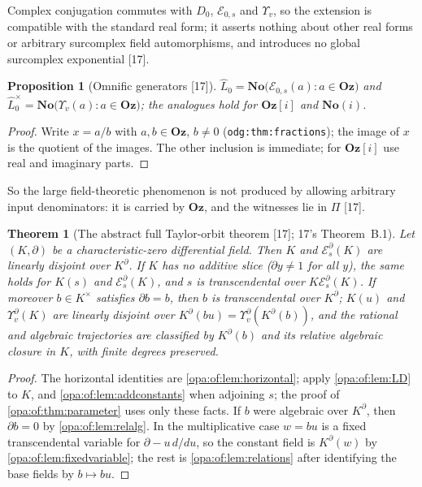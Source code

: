 \documentclass[11pt,oneside]{article}
\numberwithin{equation}{section}
\newtheorem{theorem}{Theorem}[section]
\newtheorem{proposition}[proposition]{Proposition}
\theoremstyle{definition}
\theoremstyle{remark}
\newcommand{\No}{\mathbf{No}}
\newcommand{\Oz}{\mathbf{Oz}}
\newcommand{\Og}{\mathbf{Oz}[i]}
\newcommand{\SC}{\mathbf{No}(i)}
\newcommand{\EE}{\mathcal E}
\newcommand{\src}[1]{\textup{\textsf{\small[#1]}}}
\newcommand{\lbl}[1]{\nolinkurl{#1}}
\begin{document}
Complex conjugation commutes with $D_0$, $\EE_{0,s}$ and $\Upsilon_v$, so the extension is compatible with the standard real form; it
asserts nothing about other real forms or arbitrary surcomplex field automorphisms, and introduces no global surcomplex
exponential \src{17}.

\begin{proposition}[Omnific generators \src{17}]\label{opa:of:prop:generators}
$\widehat L_0=\No\bigl(\EE_{0,s}(a):a\in\Oz\bigr)$ and $\widehat L^\times_0=\No\bigl(\Upsilon_v(a):a\in\Oz\bigr)$; the analogues hold for
$\Og$ and $\SC$.
\end{proposition}
\begin{proof}
Write $x=a/b$ with $a,b\in\Oz$, $b\ne0$ (\lbl{odg:thm:fractions}); the image of $x$ is the quotient of the images. The other
inclusion is immediate; for $\Og$ use real and imaginary parts.
\end{proof}

So the large field-theoretic phenomenon is not produced by allowing arbitrary input denominators: it is carried by $\Oz$, and
the witnesses lie in $\Pi$ \src{17}.

\begin{theorem}[The abstract full Taylor-orbit theorem \src{17}; 17's Theorem~B.1]\label{opa:of:thm:abstract}
Let $(K,\partial)$ be a characteristic-zero differential field. Then $K$ and $\EE^\partial_s(K)$ are linearly disjoint over $K^\partial$.
If $K$ has no additive slice ($\partial y\ne1$ for all $y$), the same holds for $K(s)$ and $\EE^\partial_s(K)$, and $s$ is transcendental
over $K\EE^\partial_s(K)$. If moreover $b\in K^\times$ satisfies $\partial b=b$, then $b$ is transcendental over $K^\partial$; $K(u)$ and
$\Upsilon^\partial_v(K)$ are linearly disjoint over $K^\partial(bu)=\Upsilon^\partial_v(K^\partial(b))$, and the rational and algebraic
trajectories are classified by $K^\partial(b)$ and its relative algebraic closure in $K$, with finite degrees preserved.
\end{theorem}
\begin{proof}
The horizontal identities are \cref{opa:of:lem:horizontal}; apply \cref{opa:of:lem:LD} to $K$, and \cref{opa:of:lem:addconstants}
when adjoining $s$; the proof of \cref{opa:of:thm:parameter} uses only these facts. If $b$ were algebraic over $K^\partial$, then
$\partial b=0$ by \cref{opa:of:lem:relalg}. In the multiplicative case $w=bu$ is a fixed transcendental variable for
$\partial-u\,d/du$, so the constant field is $K^\partial(w)$ by \cref{opa:of:lem:fixedvariable}; the rest is
\cref{opa:of:lem:relations} after identifying the base fields by $b\mapsto bu$.
\end{proof}
\end{document}
